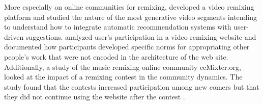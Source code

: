 More especially on online communities for remixing, \citet{shaw_community_2006} developed a video remixing platform and studied the nature of the most generative video segments intending to understand how to integrate automatic recommendation systems with user-driven suggestions.
\citet{diakopoulos_evolution_2007} analyzed user's participation in a video remixing website and documented how participants developed specific norms for appropriating other people's work that were not encoded in the architecture of the web site.
Additionally, a study of the music remixing online community ccMixter.org, looked at the impact of a remixing contest in the community dynamics.
The study found that the contests increased participation among new comers but that they did not continue using the website after the contest \citep{cheliotis_analysis_2009}. 

